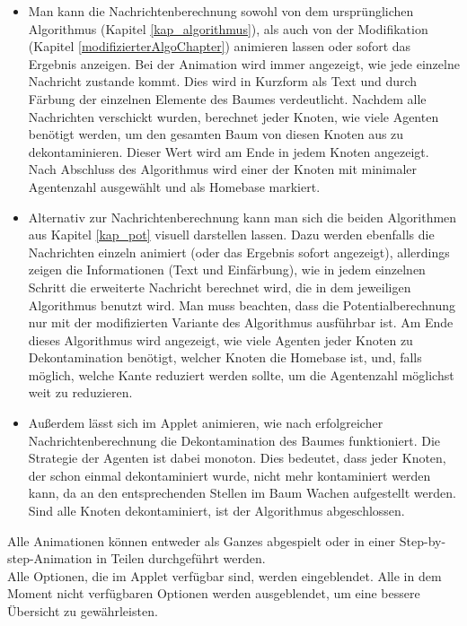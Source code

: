 \begin{itemize}
	\item Man kann die Nachrichtenberechnung sowohl von dem ursprünglichen Algorithmus (Kapitel \ref{kap_algorithmus}), als auch von der Modifikation (Kapitel \ref{modifizierterAlgoChapter}) animieren lassen oder sofort das Ergebnis anzeigen. Bei der Animation wird immer angezeigt, wie jede einzelne Nachricht zustande kommt. Dies wird in Kurzform als Text und durch Färbung der einzelnen Elemente des Baumes verdeutlicht. Nachdem alle Nachrichten verschickt wurden, berechnet jeder Knoten, wie viele Agenten benötigt werden, um den gesamten Baum von diesen Knoten aus zu dekontaminieren. Dieser Wert wird am Ende in jedem Knoten angezeigt. Nach Abschluss des Algorithmus wird einer der Knoten mit minimaler Agentenzahl ausgewählt und als Homebase markiert.
	
	\item Alternativ zur Nachrichtenberechnung kann man sich die beiden Algorithmen aus Kapitel \ref{kap_pot} visuell darstellen lassen. Dazu werden ebenfalls die Nachrichten einzeln animiert (oder das Ergebnis sofort angezeigt), allerdings zeigen die Informationen (Text und Einfärbung), wie in jedem einzelnen Schritt die erweiterte Nachricht berechnet wird, die in dem jeweiligen Algorithmus benutzt wird. Man muss beachten, dass die Potentialberechnung nur mit der modifizierten Variante des Algorithmus ausführbar ist. Am Ende dieses Algorithmus wird angezeigt, wie viele Agenten jeder Knoten zu Dekontamination benötigt, welcher Knoten die Homebase ist, und, falls möglich, welche Kante reduziert werden sollte, um die Agentenzahl möglichst weit zu reduzieren.
	
	\item Außerdem lässt sich im Applet animieren, wie nach erfolgreicher Nachrichtenberechnung die Dekontamination des Baumes funktioniert. Die Strategie der Agenten ist dabei monoton. Dies bedeutet, dass jeder Knoten, der schon einmal dekontaminiert wurde, nicht mehr kontaminiert werden kann, da an den entsprechenden Stellen im Baum Wachen aufgestellt werden. Sind alle Knoten dekontaminiert, ist der Algorithmus abgeschlossen.
\end{itemize}

Alle Animationen können entweder als Ganzes abgespielt oder in einer Step-by-step-Animation in Teilen durchgeführt werden. \\
Alle Optionen, die im Applet verfügbar sind, werden eingeblendet. Alle in dem Moment nicht verfügbaren Optionen werden ausgeblendet, um eine bessere Übersicht zu gewährleisten.


